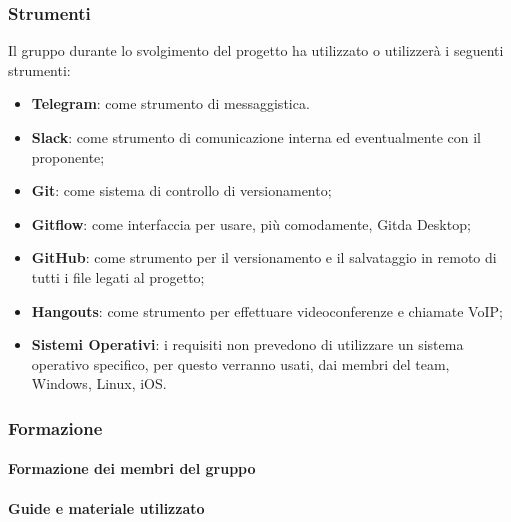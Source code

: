    		\subsubsection{Strumenti}
   			Il gruppo durante lo svolgimento del progetto ha utilizzato o utilizzerà i seguenti strumenti:
   			\begin{itemize}
   				\item \textbf{Telegram\glos}: come strumento di messaggistica.
   				\item \textbf{Slack\glos}: come strumento di comunicazione interna ed eventualmente con il proponente;
   				\item \textbf{Git\glos}: come sistema di controllo di versionamento;
   				\item \textbf{Gitflow\glos}: come interfaccia per usare, più comodamente, Git\glo da Desktop;
   				\item \textbf{GitHub\glos}: come strumento per il versionamento e il salvataggio in remoto di tutti i file legati al progetto;
   				\item \textbf{Hangouts\glos}: come strumento per effettuare videoconferenze e chiamate VoIP;
   				\item \textbf{Sistemi Operativi}: i requisiti non prevedono di utilizzare un sistema operativo specifico, per questo verranno usati, dai membri del team, Windows\glos, Linux\glos, iOS\glos.
   			\end{itemize}
   		\subsubsection{Formazione}
   			\paragraph{Formazione dei membri del gruppo}%
   			\paragraph{Guide e materiale utilizzato}%
